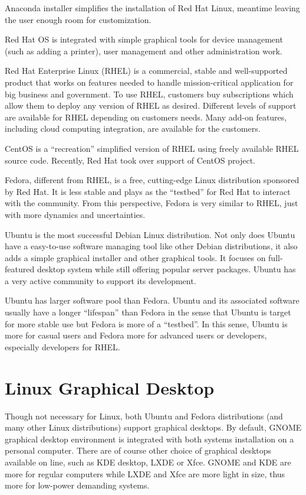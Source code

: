 Anaconda installer simplifies the installation of Red Hat Linux, meantime leaving the user enough room for customization.

Red Hat OS is integrated with simple graphical tools for device management (such as adding a printer), user management and other administration work.

Red Hat Enterprise Linux (RHEL) is a commercial, stable and well-supported product that works on features needed to handle mission-critical application for big business and government. To use RHEL, customers buy subscriptions which allow them to deploy any version of RHEL as desired. Different levels of support are available for RHEL depending on customers needs. Many add-on features, including cloud computing integration, are available for the customers.

CentOS is a ``recreation'' simplified version of RHEL using freely available RHEL source code. Recently, Red Hat took over support of CentOS project.

Fedora, different from RHEL, is a free, cutting-edge Linux distribution sponsored by Red Hat. It is less stable and plays as the ``testbed'' for Red Hat to interact with the community. From this perspective, Fedora is very similar to RHEL, just with more dynamics and uncertainties.

Ubuntu is the most successful Debian Linux distribution. Not only does Ubuntu have a easy-to-use software managing tool like other Debian distributions, it also adds a simple graphical installer and other graphical tools. It focuses on full-featured desktop system while still offering popular server packages. Ubuntu has a very active community to support its development.

Ubuntu has larger software pool than Fedora. Ubuntu and its associated software usually have a longer ``lifespan'' than Fedora in the sense that Ubuntu is target for more stable use but Fedora is more of a ``testbed''. In this sense, Ubuntu is more for casual users and Fedora more for advanced users or developers, especially developers for RHEL.

\section{Linux Graphical Desktop}

Though not necessary for Linux, both Ubuntu and Fedora distributions (and many other Linux distributions) support graphical desktops. By default, GNOME graphical desktop environment is integrated with both systems installation on a personal computer. There are of course other choice of graphical desktops available on line, such as KDE desktop, LXDE or Xfce. GNOME and KDE are more for regular computers while LXDE and Xfce are more light in size, thus more for low-power demanding systems.

